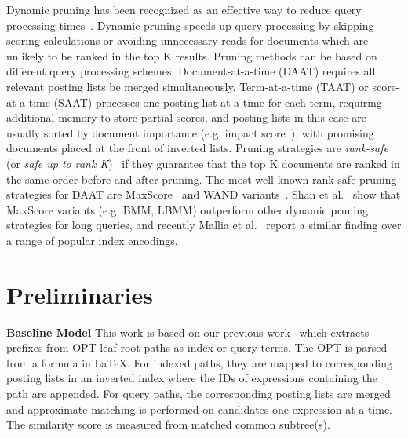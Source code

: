 \documentclass[runningheads]{llncs}
\begin{document}
Dynamic pruning has been recognized as an effective way to reduce query processing times~\cite{jonassen_simon_2011, antonio2019, macdonald2011upper, tonellotto2018efficient}.
%
Dynamic pruning speeds up query processing by skipping scoring calculations or avoiding unnecessary reads for documents which are unlikely to be ranked in the top K results.
%
Pruning methods can be based on different query processing schemes:
Document-at-a-time (DAAT) requires all relevant posting lists be merged simultaneously. Term-at-a-time (TAAT) or score-at-a-time (SAAT) processes one posting list at a time for each term, requiring additional memory to store partial scores, and posting lists in this case are usually sorted by document importance (e.g, impact score~\cite{anh2006SAAT}), with promising documents placed at  the front of inverted lists.
%
Pruning strategies are \textit{rank-safe} (or \textit{safe up to rank K})~\cite{turtle_flood_1995} if they guarantee that the top K documents are ranked in the same order before and after pruning. 
%
The most well-known rank-safe pruning strategies for DAAT are MaxScore~\cite{turtle_flood_1995, strohman_turtle_2005, jonassen_simon_2011} and WAND variants~\cite{broder2003WAND, ding2011BMW}.
%
Shan et al.~\cite{Shandongdong2012} show that MaxScore variants (e.g. BMM, LBMM) outperform other dynamic pruning strategies for long queries, and recently Mallia et al.~\cite{antonio2019} report a similar finding over a range of popular index encodings.


\section{Preliminaries}
\noindent\textbf{Baseline Model}\; This work is based on our previous work~\cite{a0_2019} which extracts prefixes from OPT leaf-root paths as index or query terms. The OPT is parsed from a formula in \LaTeX{}. For indexed paths, they are mapped to corresponding posting lists in an inverted index where the IDs of expressions containing the path are appended.
For query paths, the corresponding posting lists are merged and approximate matching is performed on candidates one expression at a time. The similarity score is measured from matched common subtree(s).
\end{document}

